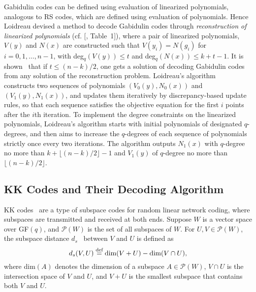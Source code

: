 \documentclass[11pt,onecolumn,draftcls]{IEEEtran}
\newcommand{\df}{\stackrel{\mbox{\scriptsize def}}{=}}
\begin{document}
Gabidulin codes can be defined using evaluation of linearized polynomials, analogous to RS codes, which are defined using evaluation of polynomials. Hence Loidreau devised a method to decode Gabidulin codes through \emph{reconstruction of linearized polynomials}\makeatletter
    \renewcommand\@cite [1]{#1}
    \makeatother (cf. [\cite{loidreau_wcc05}, Table~1]),\makeatletter
    \renewcommand\@cite [1] {[#1]}
    \makeatother
where a pair of linearized polynomials, $V(y)$ and $N(x)$ are constructed such that $V(y_i) = N(g_i)$ for $i = 0, 1, \ldots, n-1$, with deg$_q(V(y)) \le t$ and deg$_q(N(x)) \le k+t-1$. It is shown~\cite{loidreau_wcc05} that if $t \le (n - k)/2$, one gets a solution of decoding Gabidulin codes from any solution of the reconstruction problem. Loidreau's algorithm~\cite{loidreau_wcc05} constructs two sequences of polynomials $(V_0(y), N_0(x))$ and $(V_1(y), N_1(x))$, and updates them iteratively by discrepancy-based update rules, so that each sequence satisfies the objective equation for the first $i$ points after the $i$th iteration. To implement the degree constraints on the linearized polynomials, Loidreau's algorithm starts with initial polynomials of designated $q$-degrees, and then aims to increase the $q$-degrees of each sequence of polynomials strictly once every two iterations. The algorithm outputs $N_1(x)$ with $q$-degree no more than $k+\lfloor (n - k)/2 \rfloor -1$ and $V_1(y)$ of $q$-degree no more than $\lfloor (n - k)/2 \rfloor$.

\subsection{KK Codes and Their Decoding Algorithm}
\label{sec: introKK}
KK codes~\cite{kotter_it08} are a type of subspace codes for random linear network coding, where subspaces are transmitted and received at both ends. Suppose $W$ is a vector space over GF$(q)$, and $\mathcal{P}(W)$ is the set of all subspaces of $W$. For $U, V \in \mathcal{P}(W)$, the subspace distance $d_s$~\cite{kotter_it08} between $V$ and $U$ is defined as
\begin{equation} \label{equ: ds}
d_s(V, U) \df \textrm{dim}(V + U) - \textrm{dim}(V \cap U),
\end{equation}
where dim$(A)$ denotes the dimension of a subspace $A\in \mathcal{P}(W)$, $V \cap U$ is the intersection space of $V$ and $U$, and $V+U$ is the smallest subspace that contains both $V$ and $U$.
\end{document}
